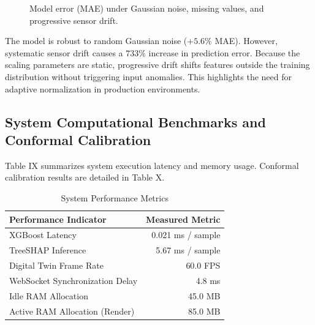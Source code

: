 \documentclass[letterpaper, 10 pt, conference]{ieeeconf}
\begin{document}
\begin{figure}[htbp]
\centering
{}
\caption{Model error (MAE) under Gaussian noise, missing values, and progressive sensor drift.}
\label{fig:robust_bar}
\end{figure}

The model is robust to random Gaussian noise ($+5.6\%$ MAE). However, systematic sensor drift causes a $733\%$ increase in prediction error. Because the scaling parameters are static, progressive drift shifts features outside the training distribution without triggering input anomalies. This highlights the need for adaptive normalization in production environments.

\subsection{System Computational Benchmarks and Conformal Calibration}
\label{subsec:benchmarks}
Table IX summarizes system execution latency and memory usage.
Conformal calibration results are detailed in Table X.

\begin{table}[htbp]
\caption{System Performance Metrics}
\label{tab:bench}
\centering\small
\begin{tabular}{lr}
\toprule
\textbf{Performance Indicator} & \textbf{Measured Metric} \\
\midrule
XGBoost Latency & 0.021 ms / sample \\
TreeSHAP Inference & 5.67 ms / sample \\
Digital Twin Frame Rate & 60.0 FPS \\
WebSocket Synchronization Delay & 4.8 ms \\
Idle RAM Allocation & 45.0 MB \\
Active RAM Allocation (Render) & 85.0 MB \\
\bottomrule
\end{tabular}
\end{table}
\end{document}
